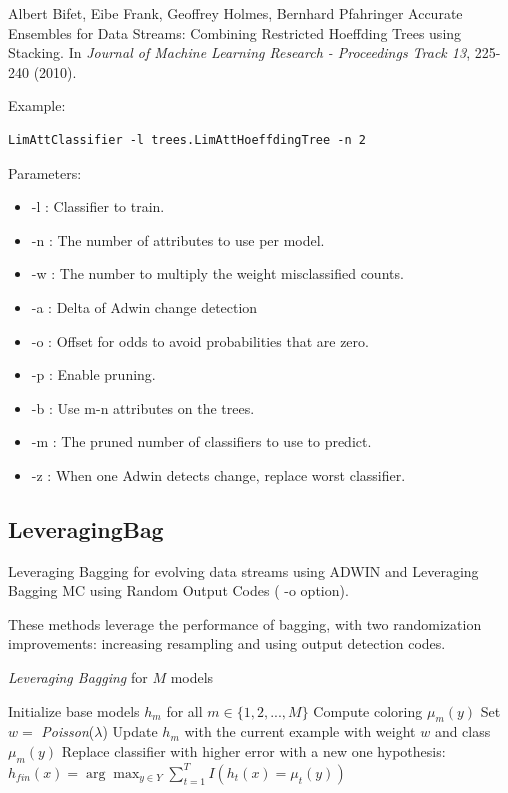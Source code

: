 \documentclass[a4paper,12pt,twoside]{book}
\begin{document}
 \begin{itemize}
Albert Bifet, Eibe Frank, Geoffrey Holmes, Bernhard Pfahringer
\newblock Accurate Ensembles for Data Streams: Combining Restricted Hoeffding Trees using Stacking.
\newblock In {\em Journal of Machine Learning Research - Proceedings Track 13},   225-240 (2010).
\end{itemize}
 
Example:
\begin{footnotesize}\begin{verbatim}
LimAttClassifier -l trees.LimAttHoeffdingTree -n 2
\end{verbatim}\end{footnotesize}

Parameters:
\begin{itemize}
\item -l : Classifier to train.
\item -n : The number of attributes to use per model.
\item -w : The number to multiply the weight misclassified counts.
\item -a : Delta of Adwin change detection
\item -o : Offset for odds to avoid probabilities that are zero.
\item -p : Enable pruning.
\item -b : Use m-n attributes on the trees.
\item -m : The pruned number of classifiers to use to predict.
\item -z : When one Adwin detects change, replace worst classifier.
\end{itemize}

\subsection{LeveragingBag}
  Leveraging Bagging for evolving data streams using ADWIN and Leveraging Bagging MC
 using Random Output Codes ( -o option).

These methods leverage the performance of bagging, with two randomization improvements: increasing resampling and using output detection codes.


\begin{algorithm}[h]
\caption{{\em Leveraging  Bagging} for $M$ models} %
\begin{algorithmic}[1]
\STATE Initialize base models $h_{m}$ for all $m \in \{1,2,...,M\}$
\STATE Compute coloring $\mu_m(y)$
{}
\STATE Set $w = $ {\em Poisson}($\lambda$)
\STATE Update $h_{m}$ with the current example with weight $w$ and class $\mu_m(y)$
\ENDFOR
\ENDFOR
{}
\STATE Replace classifier with higher error with a new one 
\ENDIF
{}
\RETURN hypothesis: $h_{fin}(x) = \arg \max_{y \in Y} \sum_{t=1}^{T} I(h_{t}(x) =\mu_t( y))$
\end{algorithmic}
\label{alg:levbag}
\end{algorithm}
\end{document}
